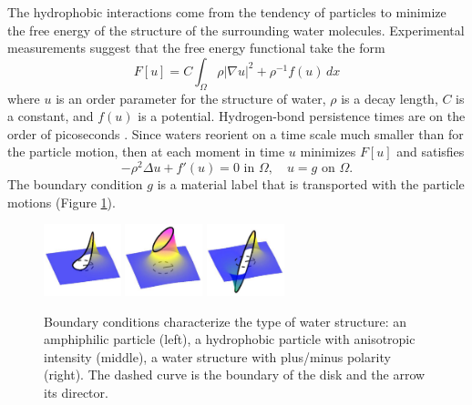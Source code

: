 The hydrophobic interactions come from the tendency 
of particles to minimize the free energy of the structure of
the surrounding water molecules.  
Experimental measurements suggest that the free energy functional
take the form 
\begin{equation}
\label{eq:free_energy}
F[u] = C \int_{\Omega}  \rho |\nabla u|^2 + \rho^{-1} f(u) \,dx
\end{equation}
where
$u$ is an order parameter for the structure of water,
$\rho$ is a decay length,
$C$ is a constant, and $f(u)$ is a potential.
Hydrogen-bond persistence times are on the order of picoseconds \cite{MaGa13}.
Since waters reorient 
on a time scale much smaller than for the particle motion, 
then at each moment in time $u$ minimizes $F[u]$ and satisfies 
\begin{equation}
\label{eq:SL}
-\rho^2 \Delta u + f'(u) = 0  \text{ in } \Omega,\quad u = g
\text{ on } \Omega.
\end{equation}
The boundary condition $g$
is a material label that is transported with the particle motions
(Figure \ref{fig:bcs}).
\begin{figure}
  \includegraphics[width=0.2\textwidth]{figures/SpecificAim1/LPA.pdf}
  \includegraphics[width=0.2\textwidth]{figures/SpecificAim1/LPB.pdf}
  \includegraphics[width=0.2\textwidth]{figures/SpecificAim1/LPC.pdf}  
\caption{
  Boundary conditions characterize the type of water structure:
  an amphiphilic particle (left),
  a hydrophobic particle with anisotropic intensity (middle),
  a water structure with plus/minus polarity (right).
  The dashed curve is the boundary of the disk and the arrow its
  director. 
}
\label{fig:bcs}
\end{figure}

